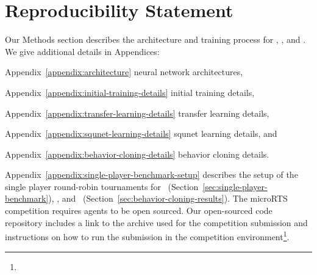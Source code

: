 \documentclass{article}
\begin{document}
\section{Reproducibility Statement}
Our Methods section describes the architecture and training process for \agentName,
\bcAgent, and \bcPPOAgent. We give additional details in Appendices:
\begin{inparaenum}[]
    \item Appendix~\ref{appendix:architecture} neural network architectures,
    \item Appendix~\ref{appendix:initial-training-details} initial training details,
    \item Appendix~\ref{appendix:transfer-learning-details} transfer learning details,
    \item Appendix~\ref{appendix:squnet-learning-details} squnet learning details, and
    \item Appendix~\ref{appendix:behavior-cloning-details} behavior cloning details.
\end{inparaenum}
Appendix~\ref{appendix:single-player-benchmark-setup} describes the setup of the
single player round-robin tournaments for \agentName\
(Section~\ref{sec:single-player-benchmark}), \bcAgent, and \bcPPOAgent\ (Section~\ref{sec:behavior-cloning-results}).
The microRTS competition requires agents to be open sourced. Our open-sourced code
repository includes a link to the archive used for the competition submission and
instructions on how to run the submission in the competition
environment\footnote{\raiMicroRTSGitHubUrl}.




\clearpage

\appendix
\end{document}
